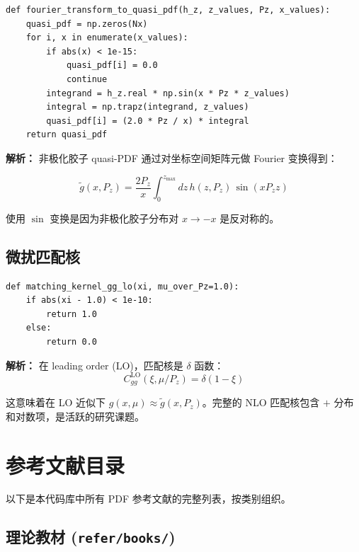 \documentclass[12pt,a4paper]{ctexart}
\begin{document}
\begin{lstlisting}[caption={Fourier 变换到 quasi-PDF}]
def fourier_transform_to_quasi_pdf(h_z, z_values, Pz, x_values):
    quasi_pdf = np.zeros(Nx)
    for i, x in enumerate(x_values):
        if abs(x) < 1e-15:
            quasi_pdf[i] = 0.0
            continue
        integrand = h_z.real * np.sin(x * Pz * z_values)
        integral = np.trapz(integrand, z_values)
        quasi_pdf[i] = (2.0 * Pz / x) * integral
    return quasi_pdf
\end{lstlisting}

\textbf{解析：}
非极化胶子 quasi-PDF 通过对坐标空间矩阵元做 Fourier 变换得到：

\begin{equation}
\tilde{g}(x, P_z) = \frac{2P_z}{x} \int_0^{z_{\max}} dz \, h(z, P_z) \, \sin(x P_z z)
\end{equation}

使用 $\sin$ 变换是因为非极化胶子分布对 $x \to -x$ 是反对称的。

\subsection{微扰匹配核}

\begin{lstlisting}[caption={LO 匹配核}]
def matching_kernel_gg_lo(xi, mu_over_Pz=1.0):
    if abs(xi - 1.0) < 1e-10:
        return 1.0
    else:
        return 0.0
\end{lstlisting}

\textbf{解析：}
在 leading order (LO)，匹配核是 $\delta$ 函数：
\begin{equation}
C_{gg}^{\text{LO}}(\xi, \mu/P_z) = \delta(1-\xi)
\end{equation}

这意味着在 LO 近似下 $g(x,\mu) \approx \tilde{g}(x, P_z)$。完整的 NLO 匹配核包含 $+$ 分布和对数项，是活跃的研究课题。

\section{参考文献目录}
\label{sec:refs}

以下是本代码库中所有 PDF 参考文献的完整列表，按类别组织。

\subsection{理论教材 (\texttt{refer/books/})}
\end{document}
